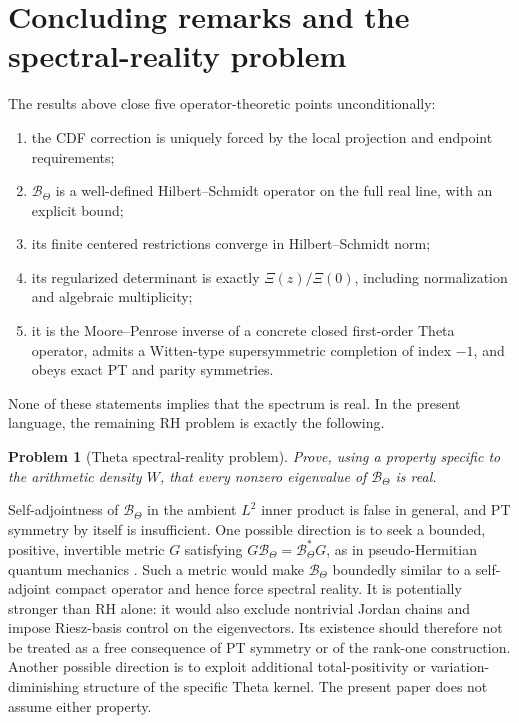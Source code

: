 \documentclass[11pt,reqno]{amsart}
\numberwithin{equation}{section}
\newtheorem{problem}[problem]{Problem}
\newcommand{\1}{\mathbf 1}
\newcommand{\BTheta}{\mathcal B_{\Theta}}
\begin{document}
\section{Concluding remarks and the spectral-reality problem}

The results above close five operator-theoretic points unconditionally:
\begin{enumerate}[label=(\arabic*),leftmargin=2.2em]
 \item the CDF correction is uniquely forced by the local projection and
 endpoint requirements;
 \item $\BTheta$ is a well-defined Hilbert--Schmidt operator on the full real
 line, with an explicit bound;
 \item its finite centered restrictions converge in Hilbert--Schmidt norm;
 \item its regularized determinant is exactly $\Xi(z)/\Xi(0)$, including
 normalization and algebraic multiplicity;
 \item it is the Moore--Penrose inverse of a concrete closed first-order
 Theta operator, admits a Witten-type supersymmetric completion of index
 $-1$, and obeys exact PT and parity symmetries.
\end{enumerate}

None of these statements implies that the spectrum is real.  In the present
language, the remaining RH problem is exactly the following.

\begin{problem}[Theta spectral-reality problem]\label{prob:reality}
Prove, using a property specific to the arithmetic density $W$, that every
nonzero eigenvalue of $\BTheta$ is real.
\end{problem}

Self-adjointness of $\BTheta$ in the ambient $L^2$ inner product is false in
general, and PT symmetry by itself is insufficient.  One possible direction
is to seek a bounded, positive, invertible metric $G$ satisfying
$G\BTheta=\BTheta^*G$, as in pseudo-Hermitian quantum mechanics
\cite{Mostafazadeh2002,Mostafazadeh2002III}.  Such a metric would make
$\BTheta$ boundedly similar to a self-adjoint compact operator and hence force
spectral reality.  It is potentially stronger than RH alone: it would also
exclude nontrivial Jordan chains and impose Riesz-basis control on the
eigenvectors.  Its existence should therefore not be treated as a free
consequence of PT symmetry or of the rank-one construction.  Another possible
direction is to exploit additional total-positivity or variation-diminishing
structure of the specific Theta kernel.  The present paper does not assume
either property.
\end{document}

